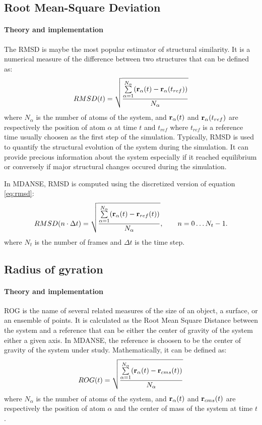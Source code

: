 \documentclass[a4paper,11pt]{article}
\begin{document}
\subsection{Root Mean-Square Deviation}
\label{rmsd}
\paragraph{Theory and implementation\\}
\label{rmsd_theory}
The \gls{RMSD} is maybe the most popular estimator of structural similarity. It is a
numerical measure of the difference between two structures that can be defined as:
\begin{equation}
\label{eq:rmsd}
RMSD(t) = \sqrt{\frac{\sum\limits_{\alpha = 1}^{N_{\alpha}}({\bf r}_{\alpha}(t) - {\bf r}_{\alpha}(t_{ref}))}{N_{\alpha}}}
\end{equation}
where $N_{\alpha}$ is the number of atoms of the system, and ${\bf r}_{\alpha}(t)$ and ${\bf r}_{\alpha}(t_{ref})$ are
respectively the position of atom $\alpha$ at time $t$ and $t_{ref}$ where $t_{ref}$ is a reference time usually
choosen as the first step of the simulation.
Typically, \gls{RMSD} is used to quantify the structural evolution of the system during the simulation. It can
provide precious information about the system especially if it reached equilibrium or conversely if major
structural changes occured during the simulation.

In \gls{MDANSE}, \gls{RMSD} is computed using the discretized version of equation \ref{eq:rmsd}:
\begin{equation}
\label{eq:rmsd_num}
RMSD(n\cdot\Delta t) = \sqrt{\frac{\sum\limits_{\alpha = 1}^{N_{\alpha}}({\bf r}_{\alpha}(t) - {\bf r}_{ref}(t))}{N_{\alpha}}},
\qquad n = 0\ldots N_t - 1.
\end{equation}
where $N_t$ is the number of frames and $\Delta t$ is the time step.

\subsection{Radius of gyration}
\label{rog}
\paragraph{Theory and implementation\\}
\label{rog_theory}
\gls{ROG} is the name of several related measures of the size of an object, a surface, or an ensemble of
points. It is calculated as the Root Mean Square Distance between the system and a reference that can be either
the center of gravity of the system either a given axis. In \gls{MDANSE}, the reference is choosen to be the center
of gravity of the system under study. Mathematically, it can be defined as:
\begin{equation}
\label{eq:rog}
ROG(t) = \sqrt{\frac{\sum\limits_{\alpha = 1}^{N_{\alpha}}({\bf r}_{\alpha}(t) - {\bf r}_{cms}(t))}{N_{\alpha}}}
\end{equation}
where $N_{\alpha}$ is the number of atoms of the system, and ${\bf r}_{\alpha}(t)$ and ${\bf r}_{cms}(t)$ are
respectively the position of atom $\alpha$ and the center of mass of the system at time $t$.
\end{document}
